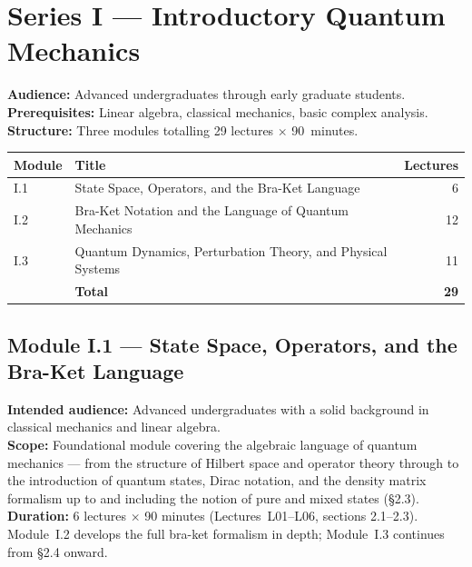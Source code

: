 \documentclass[11pt,a4paper]{article}
\newcommand{\coursebadge}[1]{%
  \begin{tcolorbox}[highlightbox]#1\end{tcolorbox}%
}
\begin{document}
\section{Series I --- Introductory Quantum Mechanics}
\label{sec:seriesI}

\begin{tcolorbox}[seriesbox, title={Series~I Overview}]
\textbf{Audience:} Advanced undergraduates through early graduate students.\\
\textbf{Prerequisites:} Linear algebra, classical mechanics, basic complex analysis.\\
\textbf{Structure:} Three modules totalling 29 lectures $\times$ 90~minutes.\\[4pt]
\begin{tabular}{llr}
\toprule
\textbf{Module} & \textbf{Title} & \textbf{Lectures}\\
\midrule
I.1 & State Space, Operators, and the Bra-Ket Language & 6\\
I.2 & Bra-Ket Notation and the Language of Quantum Mechanics & 12\\
I.3 & Quantum Dynamics, Perturbation Theory, and Physical Systems & 11\\
\midrule
 & \textbf{Total} & \textbf{29}\\
\bottomrule
\end{tabular}
\end{tcolorbox}

\subsection{Module I.1 --- State Space, Operators, and the Bra-Ket Language}
\label{sec:mod-I1}

\coursebadge{%
  \textbf{Intended audience:} Advanced undergraduates with a solid background in
  classical mechanics and linear algebra.\\[2pt]
  \textbf{Scope:} Foundational module covering the algebraic language of quantum
  mechanics --- from the structure of Hilbert space and operator theory through
  to the introduction of quantum states, Dirac notation, and the density matrix
  formalism up to and including the notion of pure and mixed states (\S2.3).\\[2pt]
  \textbf{Duration:} 6 lectures $\times$ 90 minutes (Lectures~L01--L06,
  sections 2.1--2.3). Module~I.2 develops the full bra-ket formalism in
  depth; Module~I.3 continues from \S2.4 onward.
}
\end{document}
